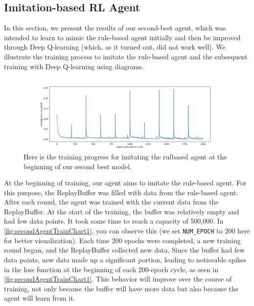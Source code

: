 \newpage
{}

\subsection{Imitation-based RL Agent}

In this section, we present the results of our second-best agent, which was intended to learn to mimic the rule-based agent initially and 
then be improved through Deep Q-learning (which, as it turned out, did not work well). We illustrate the training process to imitate the rule-based 
agent and the subsequent training with Deep Q-learning using diagrams.

\begin{figure}[H]
    \centering
    
    \includegraphics[width=\oneImgWidth]{images/secondAgentTrainChart1}%
    
    \captionadjust%
    \caption{\label{fig:secondAgentTrainChart1} Here is  the training progress for imitating the rulbased agent at the beginning of our second best model.
    }%
\end{figure}

At the beginning of training, our agent aims to imitate the rule-based agent. For this purpose, the ReplayBuffer was filled with data 
from the rule-based agent. After each round, the agent was trained with the current data from the ReplayBuffer. At the start of the training, 
the buffer was relatively empty and had few data points. It took some time to reach a capacity of 500,000. In \autoref{fig:secondAgentTrainChart1}, you can observe 
this (we set \verb|NUM_EPOCH| to 200 here for better visualization). Each time 200 epochs were completed, a new training round began, and the 
ReplayBuffer collected new data. Since the buffer had few data points, new data made up a significant portion, leading to noticeable spikes 
in the loss function at the beginning of each 200-epoch cycle, as seen in \autoref{fig:secondAgentTrainChart1}. This behavior will improve over the course of training, not 
only because the buffer will have more data but also because the agent will learn from it.

